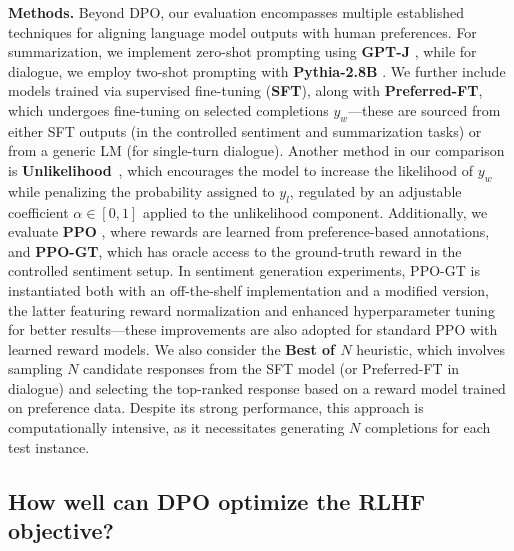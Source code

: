 \textbf{Methods.} Beyond DPO, our evaluation encompasses multiple established techniques for aligning language model outputs with human preferences. For summarization, we implement zero-shot prompting using \textbf{GPT-J} \citep{gpt-j}, while for dialogue, we employ two-shot prompting with \textbf{Pythia-2.8B} \citep{biderman2023pythia}. We further include models trained via supervised fine-tuning (\textbf{SFT}), along with \textbf{Preferred-FT}, which undergoes fine-tuning on selected completions $y_w$—these are sourced from either SFT outputs (in the controlled sentiment and summarization tasks) or from a generic LM (for single-turn dialogue). Another method in our comparison is \textbf{Unlikelihood}~\citep{welleck2019neural}, which encourages the model to increase the likelihood of $y_w$ while penalizing the probability assigned to $y_l$, regulated by an adjustable coefficient $\alpha \in [0,1]$ applied to the unlikelihood component. Additionally, we evaluate \textbf{PPO} \citep{schulman2017proximal}, where rewards are learned from preference-based annotations, and \textbf{PPO-GT}, which has oracle access to the ground-truth reward in the controlled sentiment setup. In sentiment generation experiments, PPO-GT is instantiated both with an off-the-shelf implementation \cite{leandro_von_werra_2023_7790115} and a modified version, the latter featuring reward normalization and enhanced hyperparameter tuning for better results—these improvements are also adopted for standard PPO with learned reward models. We also consider the \textbf{Best of $N$} heuristic, which involves sampling $N$ candidate responses from the SFT model (or Preferred-FT in dialogue) and selecting the top-ranked response based on a reward model trained on preference data. Despite its strong performance, this approach is computationally intensive, as it necessitates generating $N$ completions for each test instance.

\subsection{How well can DPO optimize the RLHF objective?}

